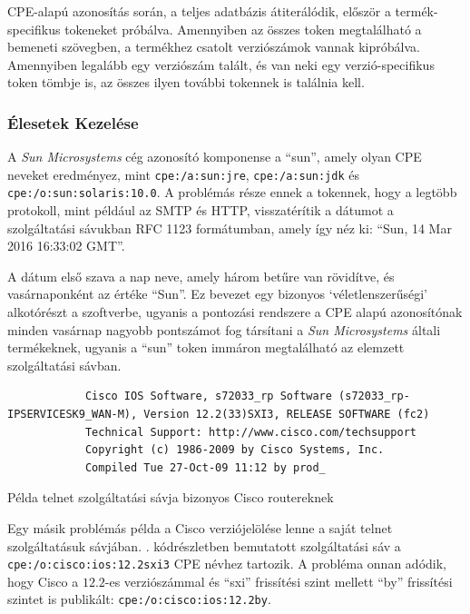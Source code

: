 	CPE-alapú azonosítás során, a teljes adatbázis átiterálódik, először a termék-specifikus tokeneket próbálva. Amennyiben az összes token megtalálható a bemeneti szövegben, a termékhez csatolt verziószámok vannak kipróbálva. Amennyiben legalább egy verziószám talált, és van neki egy verzió-specifikus token tömbje is, az összes ilyen további tokennek is találnia kell.
	
\subsubsection*{Élesetek Kezelése} \label{ssec:cpeedges}

	A \textit{Sun Microsystems} cég azonosító komponense a ``sun'', amely olyan CPE neveket eredményez, mint \texttt{cpe:/a:sun:jre}, \texttt{cpe:/a:sun:jdk} és \texttt{cpe:/o:sun:solaris:10.0}. A problémás része ennek a tokennek, hogy a legtöbb protokoll, mint például az SMTP és HTTP, visszatérítik a dátumot a szolgáltatási sávukban RFC 1123 formátumban\cite{rfc2616}, amely így néz ki: ``Sun, 14 Mar 2016 16:33:02 GMT''.
	
	A dátum első szava a nap neve, amely három betűre van rövidítve, és vasárnaponként az értéke ``Sun''. Ez bevezet egy bizonyos `véletlenszerűségi' alkotórészt a szoftverbe, ugyanis a pontozási rendszere a CPE alapú azonosítónak minden vasárnap nagyobb pontszámot fog társítani a \textit{Sun Microsystems} általi termékeknek, ugyanis a ``sun'' token immáron megtalálható az elemzett szolgáltatási sávban.
	
	\begin{listing}[H]
		\begin{verbatim}
			Cisco IOS Software, s72033_rp Software (s72033_rp-IPSERVICESK9_WAN-M), Version 12.2(33)SXI3, RELEASE SOFTWARE (fc2)
			Technical Support: http://www.cisco.com/techsupport
			Copyright (c) 1986-2009 by Cisco Systems, Inc.
			Compiled Tue 27-Oct-09 11:12 by prod_
		\end{verbatim}
		\caption{Példa telnet szolgáltatási sávja bizonyos Cisco routereknek}
		\label{ciscosvcbnr}
	\end{listing}

	Egy másik problémás példa a Cisco verziójelölése lenne a saját telnet szolgáltatásuk sávjában. \Az{\ref{ciscosvcbnr}}. kódrészletben bemutatott szolgáltatási sáv a \texttt{cpe:/o:cisco:ios:12.2sxi3} CPE névhez tartozik. A probléma onnan adódik, hogy Cisco a $12.2$-es verziószámmal és ``sxi'' frissítési szint mellett ``by'' frissítési szintet is publikált: \texttt{cpe:/o:cisco:ios:12.2by}.
	
